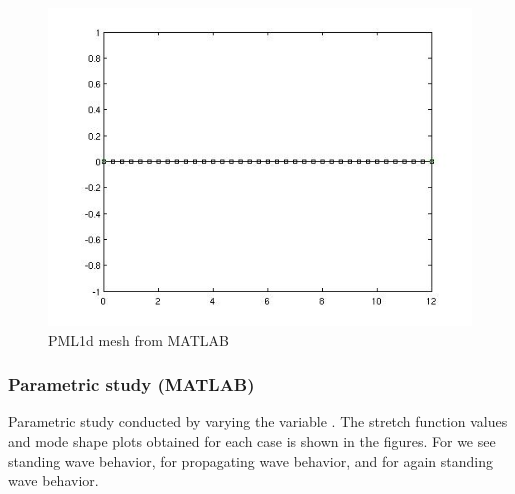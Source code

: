 \begin{figure}[htbp]
    \includegraphics[width=\linewidth]{fig/pml1d_mesh_matlab.jpg}
    \caption{PML1d mesh from MATLAB}
    \label{fig:PML1dMeshMATLAB}
\end{figure}

\clearpage
\subsubsection*{Parametric study (MATLAB)}
Parametric study conducted by varying the variable 
. The stretch function values and mode shape plots
obtained for each case is shown in the figures.
For  we see standing wave behavior, for 
propagating wave behavior, and for  again
standing wave behavior. 

